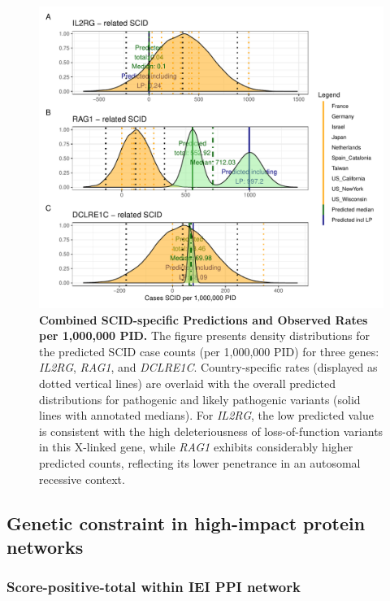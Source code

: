 \begin{figure}[ht]
  \centering
  \includegraphics[width=.75\textwidth]{../images/validation_studies_scid_combined_plot.pdf}
  \caption{\textbf{Combined SCID-specific Predictions and Observed Rates per 1,000,000 PID.}
    The figure presents density distributions for the predicted SCID case counts (per 1,000,000 PID) for three genes: \textit{IL2RG}, \textit{RAG1}, and \textit{DCLRE1C}. Country-specific rates (displayed as dotted vertical lines) are overlaid with the overall predicted distributions for pathogenic and likely pathogenic variants (solid lines with annotated medians). For \textit{IL2RG}, the low predicted value is consistent with the high deleteriousness of loss-of-function variants in this X-linked gene, while \textit{RAG1} exhibits considerably higher predicted counts, reflecting its lower penetrance in an autosomal recessive context.}
  \label{fig:scid_combined}
\end{figure}


\FloatBarrier
\subsection{Genetic constraint in high-impact protein networks}
\subsubsection{Score-positive-total within IEI PPI network}


